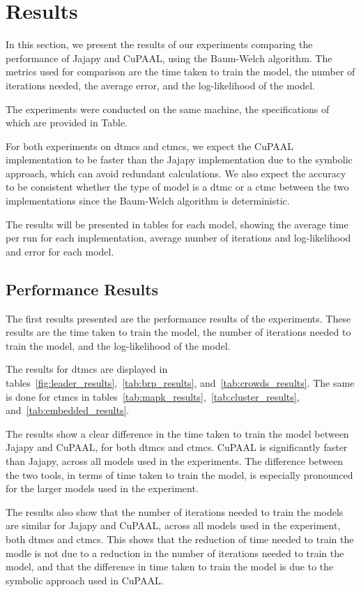 \section{Results}\label{sec:results}
In this section, we present the results of our experiments comparing the performance of Jajapy and CuPAAL, using the Baum-Welch algorithm.
The metrics used for comparison are the time taken to train the model, the number of iterations needed, the average error, and the log-likelihood of the model.

The experiments were conducted on the same machine, the specifications of which are provided in Table.

For both experiments on \glspl{dtmc} and \glspl{ctmc}, we expect the CuPAAL implementation to be faster than the Jajapy implementation due to the symbolic approach, which can avoid redundant calculations.
We also expect the accuracy to be consistent whether the type of model is a \gls{dtmc} or a \gls{ctmc} between the two implementations since the Baum-Welch algorithm is deterministic.

The results will be presented in tables for each model, showing the average time per run for each implementation, average number of iterations and log-likelihood and error for each model.

\subsection{Performance Results}\label{subsec:results_performance}
The first results presented are the performance results of the experiments.
These results are the time taken to train the model, the number of iterations needed to train the model, and the log-likelihood of the model.

The results for \glspl{dtmc} are displayed in tables~\autoref{fig:leader_results},~\autoref{tab:brp_results}, and~\autoref{tab:crowds_results}.
The same is done for \glspl{ctmc} in tables~\autoref{tab:mapk_results},~\autoref{tab:cluster_results}, and~\autoref{tab:embedded_results}.

The results show a clear difference in the time taken to train the model between Jajapy and CuPAAL, for both \glspl{dtmc} and \glspl{ctmc}.
CuPAAL is significantly faster than Jajapy, across all models used in the experiments.
The difference between the two tools, in terms of time taken to train the model, is especially pronounced for the larger models used in the experiment.

The results also show that the number of iterations needed to train the models are similar for Jajapy and CuPAAL, across all models used in the experiment, both \glspl{dtmc} and \glspl{ctmc}.
This shows that the reduction of time needed to train the modle is not due to a reduction in the number of iterations needed to train the model, and that the difference in time taken to train the model is due to the symbolic approach used in CuPAAL.

